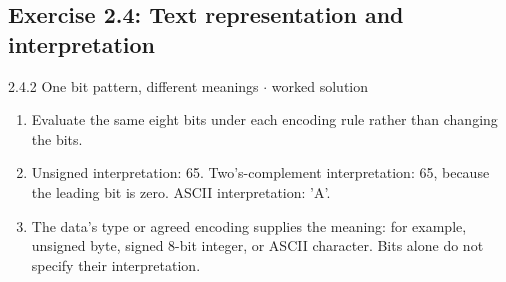 \documentclass[11pt]{article}
\begin{document}
\begin{keepsection}\subsection{Exercise 2.4: Text representation and interpretation}

\begin{workedbox}{2.4.2 One bit pattern, different meanings \ensuremath{\cdot} worked solution}
\begin{enumerate}
\item Evaluate the same eight bits under each encoding rule rather than changing the bits.
\item Unsigned interpretation: 65. Two’s-complement interpretation: 65, because the leading bit is zero. ASCII interpretation: 'A'.
\item The data’s type or agreed encoding supplies the meaning: for example, unsigned byte, signed 8-bit integer, or ASCII character. Bits alone do not specify their interpretation.
\end{enumerate}
\end{workedbox}

\end{keepsection}
\end{document}
